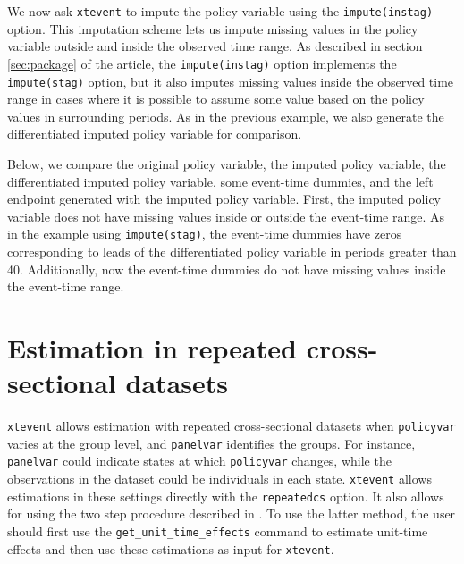 \documentclass[12pt]{article}
\begin{document}
\begin{stlog}
	\nullskip
\end{stlog}

We now ask \texttt{xtevent} to impute the policy variable using the \texttt{impute(instag)} option.
This imputation scheme lets us impute missing values in the policy variable outside and inside the observed time range.
As described in section \ref{sec:package} of the article, the \texttt{impute(instag)} option implements the \texttt{impute(stag)} option, but it also imputes missing values inside the observed time range in cases where it is possible to assume some value based on the policy values in surrounding periods.
As in the previous example, we also generate the differentiated imputed policy variable for comparison.

\begin{stlog}
	\nullskip
\end{stlog}

Below, we compare the original policy variable, the imputed policy variable, the differentiated imputed policy variable, some event-time dummies, and the left endpoint generated with the imputed policy variable.
First, the imputed policy variable does not have missing values inside or outside the event-time range.
As in the example using \texttt{impute(stag)}, the event-time dummies have zeros corresponding to leads of the differentiated policy variable in periods greater than 40. Additionally, now the event-time dummies do not have missing values inside the event-time range.

\begin{stlog}
	\nullskip
\end{stlog}

\section{Estimation in repeated cross-sectional datasets}
\label{sec:xsection}

\texttt{xtevent} allows estimation with repeated cross-sectional datasets when \texttt{policyvar} varies at the group level, and \texttt{panelvar} identifies the groups.
For instance, \texttt{panelvar} could indicate states at which \texttt{policyvar} changes, while the observations in the dataset could be individuals in each state.
\texttt{xtevent} allows estimations in these settings directly with the \texttt{repeatedcs} option.
It also allows for using the two step procedure described in \citet{hansen2007generalized}.
To use the latter method, the user should first use the \texttt{get\_unit\_time\_effects} command to estimate unit-time effects and then use these estimations as input for \texttt{xtevent}.
\end{document}
